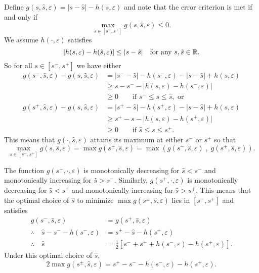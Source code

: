 \documentclass{article}[12pt]
\begin{document}
Define $g(s,\hat{s},\varepsilon)=\lvert s - \hat{s} \rvert -h(s,\varepsilon)$ and note that the error criterion is met if and only if 
\begin{equation}
    \max_{s \in [s^-,s^+]} g(s,\hat{s},\varepsilon) \leq 0.
\end{equation}
We assume $h(\cdot,\varepsilon)$ satisfies 
\begin{equation}
    \lvert h(s,\varepsilon) - h(\tilde{s},\varepsilon) \rvert \leq \lvert s - \tilde{s} \rvert \quad \text{for any } s,\tilde{s} \in \mathbb{R}.
\end{equation}
So for all $s \in [s^-,s^+]$ we have either
\begin{align}
    g(s^-,\hat{s},\varepsilon)-g(s,\hat{s},\varepsilon) 
    &= \lvert s^- - \hat{s} \rvert -h(s^-,\varepsilon) - \lvert s - \hat{s} \rvert  + h(s,\varepsilon) \\
    &\geq s - s^- - \lvert h(s,\varepsilon)-h(s^-,\varepsilon) \rvert \\
    &\geq 0 \qquad \text{if } s^- \leq s \leq \hat{s}, \text{ or} \\
    g(s^+,\hat{s},\varepsilon)-g(s,\hat{s},\varepsilon) 
    &= \lvert s^+ - \hat{s} \rvert -h(s^+,\varepsilon) - \lvert s - \hat{s} \rvert  + h(s,\varepsilon) \\
    &\geq s^+ - s - \lvert h(s,\varepsilon)-h(s^+,\varepsilon) \rvert \\
    &\geq 0 \qquad \text{if } \hat{s} \leq s \leq s^+.
\end{align}
This means that $g(\cdot,\hat{s},\varepsilon)$ attains its maximum at either $s^-$ or $s^+$ so that
\begin{equation}
    \max_{s \in [s^-,s^+]} g(s,\hat{s},\varepsilon) = \max g(s^\pm,\hat{s},\varepsilon) = \max\left(g(s^-,\hat{s},\varepsilon) \;,\; g(s^+,\hat{s},\varepsilon)\right).
\end{equation}

The function $g(s^-,\cdot,\varepsilon)$ is monotonically decreasing for $\hat{s} < s^-$ and monotonically increasing for $\hat{s} > s^-$. Similarly, $g(s^+,\cdot,\varepsilon)$ is monotonically decreasing for $\hat{s} < s^+$ and monotonically increasing for $\hat{s} > s^+$. This means that the optimal choice of $\hat{s}$ to minimize $\max g(s^\pm,\hat{s},\varepsilon)$ lies in $[s^-,s^+]$ and satisfies
\begin{align}
    g(s^-,\hat{s},\varepsilon) &= g(s^+,\hat{s},\varepsilon) \\
    \therefore \quad \hat{s} - s^- - h(s^-,\varepsilon) &= s^+ - \hat{s} - h(s^+,\varepsilon) \\ 
    \therefore \quad \hat{s} &= \frac{1}{2}\left[ s^- + s^+ +h(s^-,\varepsilon) - h(s^+,\varepsilon) \right]. \label{eq:shat_opt}
\end{align}
Under this optimal choice of $\hat{s}$, 
\begin{equation}
    \label{eq:g_under_shat_opt}
    2 \max g(s^\pm,\hat{s},\varepsilon) =  s^+  -  s^-  - h(s^-,\varepsilon) - h(s^+,\varepsilon).
\end{equation}
\end{document}
